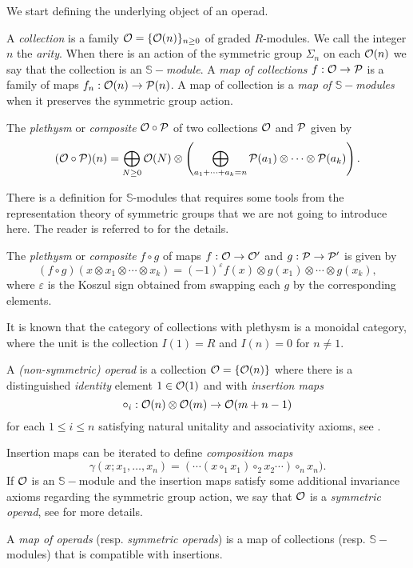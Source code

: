 \documentclass[Thesis.tex]{subfiles}
\begin{document}
We start defining the underlying object of an operad.

\begin{defin}\label{collections}
A \emph{collection} is a family ${\mathcal O}=\{{\mathcal O}(n)\}_{n\geq 0}$ of graded $R$-modules. We call the integer $n$ the \emph{arity}. When there is an action of the symmetric group $\Sigma_n$ on each ${\mathcal O}(n)$ we say that the collection is an \emph{$\mathbb{S}-$module}. A \emph{map of collections} $f:{\mathcal O}\to\mathcal{P}$ is a family of maps $f_n:{\mathcal O}(n)\to\mathcal{P}(n)$. A map of collection is a \emph{map of $\mathbb{S}-$modules} when it preserves the symmetric group action.
\end{defin}

\begin{defin}
The \emph{plethysm} or \emph{composite} ${\mathcal O}\circ\mathcal{P}$ of two collections ${\mathcal O}$ and $\mathcal{P}$ given by
\[({\mathcal O}\circ\mathcal{P})(n)=\bigoplus_{N\geq 0}{\mathcal O}(N)\otimes \left(\bigoplus_{a_1+\cdots+a_k=n} \mathcal{P}(a_1)\otimes\cdots\otimes \mathcal{P}(a_k)\right).\]
\end{defin}
There is a definition for $\mathbb{S}$-modules that requires some tools from the representation theory of symmetric groups that we are not going to introduce here. The reader is referred to \cite{lodayvallette} for the details. 

\begin{defin}
The \emph{plethysm} or \emph{composite} $f\circ g$ of maps $f:{\mathcal O}\to{\mathcal O}'$ and $g:\mathcal{P}\to\mathcal{P}'$ is given by
\[(f\circ g)(x\otimes x_1\otimes\cdots\otimes x_k)=(-1)^{\varepsilon} f(x)\otimes g(x_1)\otimes\cdots\otimes g(x_k),\]
where $\varepsilon$ is the Koszul sign obtained from swapping each $g$ by the corresponding elements. 
\end{defin}


It is known that the category of collections with plethysm is a monoidal category, where the unit is the collection $I(1)=R$ and $I(n)=0$ for $n\neq 1$. 
\begin{defin}
A \emph{(non-symmetric) operad} is a collection ${\mathcal O}=\{{\mathcal O}(n)\}$ where there is a distinguished \emph{identity} element $1\in{\mathcal O}(1)$ and with \emph{insertion maps} 
\[\circ_i:{\mathcal O}(n)\otimes {\mathcal O}(m)\to {\mathcal O}(m+n-1)\]
for each $1\leq i\leq n$ satisfying natural unitality and associativity axioms, see \cite[\S 1.1.2]{ward}. 

Insertion maps can be iterated to define \emph{composition maps} \[\gamma(x;x_1,\dots, x_n)=(\cdots(x\circ_1 x_1)\circ_2 x_2\cdots
)\circ_n x_n).\]
If ${\mathcal O}$ is an $\mathbb{S}-$module and the insertion maps satisfy some additional invariance axioms regarding the symmetric group action, we say that ${\mathcal O}$ is a \emph{symmetric operad}, see \cite{lodayvallette} for more details.

A \emph{map of operads} (resp. \emph{symmetric operads}) is a map of collections (resp. $\mathbb{S}-$modules) that is compatible with insertions.
\end{defin}
\end{document}
